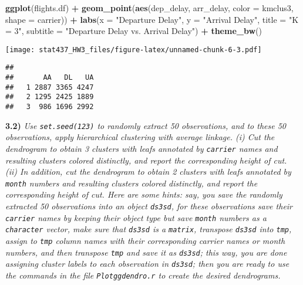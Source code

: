 \documentclass[
]{article}
\newenvironment{Shaded}{\begin{snugshade}}{\end{snugshade}}
\newcommand{\AttributeTok}[1]{\textcolor[rgb]{0.13,0.29,0.53}{#1}}
\newcommand{\FunctionTok}[1]{\textcolor[rgb]{0.13,0.29,0.53}{\textbf{#1}}}
\newcommand{\NormalTok}[1]{#1}
\newcommand{\SpecialCharTok}[1]{\textcolor[rgb]{0.81,0.36,0.00}{\textbf{#1}}}
\newcommand{\StringTok}[1]{\textcolor[rgb]{0.31,0.60,0.02}{#1}}
\begin{document}
\begin{Shaded}
\begin{Highlighting}[]
\FunctionTok{ggplot}\NormalTok{(flights.df) }\SpecialCharTok{+} \FunctionTok{geom\_point}\NormalTok{(}\FunctionTok{aes}\NormalTok{(dep\_delay, arr\_delay, }\AttributeTok{color =}\NormalTok{ kmclus3,}
    \AttributeTok{shape =}\NormalTok{ carrier)) }\SpecialCharTok{+} \FunctionTok{labs}\NormalTok{(}\AttributeTok{x =} \StringTok{"Departure Delay"}\NormalTok{, }\AttributeTok{y =} \StringTok{"Arrival Delay"}\NormalTok{,}
    \AttributeTok{title =} \StringTok{"K = 3"}\NormalTok{, }\AttributeTok{subtitle =} \StringTok{"Departure Delay vs. Arrival Delay"}\NormalTok{) }\SpecialCharTok{+}
    \FunctionTok{theme\_bw}\NormalTok{()}
\end{Highlighting}
\end{Shaded}

\texttt{[image: stat437\_HW3\_files/figure-latex/unnamed-chunk-6-3.pdf]}

\begin{Shaded}
\end{Shaded}

\begin{verbatim}
##    
##       AA   DL   UA
##   1 2887 3365 4247
##   2 1295 2425 1889
##   3  986 1696 2992
\end{verbatim}

\textbf{3.2)} \emph{Use \texttt{set.seed(123)} to randomly extract 50
observations, and to these 50 observations, apply hierarchical
clustering with average linkage. (i) Cut the dendrogram to obtain 3
clusters with leafs annotated by \texttt{carrier} names and resulting
clusters colored distinctly, and report the corresponding height of cut.
(ii) In addition, cut the dendrogram to obtain 2 clusters with leafs
annotated by \texttt{month} numbers and resulting clusters colored
distinctly, and report the corresponding height of cut. Here are some
hints: say, you save the randomly extracted 50 observations into an
object \texttt{ds3sd}, for these observations save their
\texttt{carrier} names by keeping their object type but save
\texttt{month} numbers as a \texttt{character} vector, make sure that
\texttt{ds3sd} is a \texttt{matrix}, transpose \texttt{ds3sd} into
\texttt{tmp}, assign to \texttt{tmp} column names with their
corresponding carrier names or month numbers, and then transpose
\texttt{tmp} and save it as \texttt{ds3sd}; this way, you are done
assigning cluster labels to each observation in \texttt{ds3sd}; then you
are ready to use the commands in the file \texttt{Plotggdendro.r} to
create the desired dendrograms.}
\end{document}
